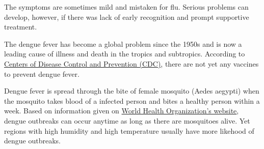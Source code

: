 \documentclass[11pt]{article}
\begin{document}
The symptoms are sometimes mild and mistaken for flu. Serious problems
can develop, however, if there was lack of early recognition and prompt
supportive treatment.

The dengue fever has become a global problem since the 1950s and is now
a leading cause of illness and death in the tropics and subtropics.
According to \href{https://www.cdc.gov/dengue/index.html}{Centers of
Disease Control and Prevention (CDC)}, there are not yet any vaccines to
prevent dengue fever.

Dengue fever is spread through the bite of female mosquito (Aedes
aegypti) when the mosquito takes blood of a infected person and bites a
healthy person within a week. Based on information given on
\href{http://www.who.int/denguecontrol/faq/en/index1.html}{World Health
Organization's website}, dengue outbreaks can occur anytime as long as
there are mosquitoes alive. Yet regions with high humidity and high
temperature usually have more likehood of dengue outbreaks.
\end{document}
